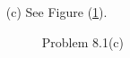 \documentclass[twoside]{amsart}
\theoremstyle{plain}
\theoremstyle{definition}
\begin{document}
\begin{itemize}
\item[(c)] See Figure (\ref{Fi:Problem08.1(c)}).  \begin{figure}
\caption{Problem 8.1(c)}\label{Fi:Problem08.1(c)}
\end{figure}
\end{itemize}
\end{document}
